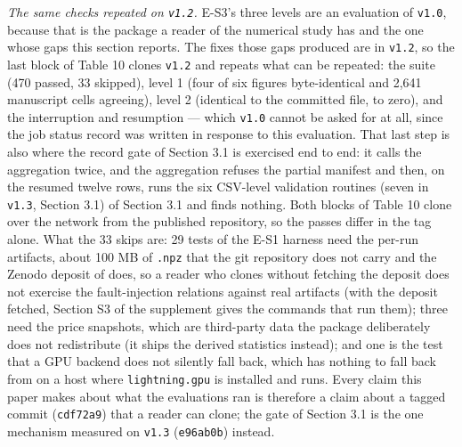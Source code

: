 \documentclass[acmsmall,screen,review]{acmart}
\begin{document}
\textit{The same checks repeated on \texttt{v1.2}.} E-S3's three levels are an evaluation of \texttt{v1.0}, because that is the package a reader of the numerical study has and the one whose gaps this section reports. The fixes those gaps produced are in \texttt{v1.2}, so the last block of Table 10 clones \texttt{v1.2} and repeats what can be repeated: the suite (470 passed, 33 skipped), level 1 (four of six figures byte-identical and 2,641 manuscript cells agreeing), level 2 (identical to the committed file, to zero), and the interruption and resumption --- which \texttt{v1.0} cannot be asked for at all, since the job status record was written in response to this evaluation. That last step is also where the record gate of Section 3.1 is exercised end to end: it calls the aggregation twice, and the aggregation refuses the partial manifest and then, on the resumed twelve rows, runs the six CSV-level validation routines (seven in \texttt{v1.3}, Section 3.1) of Section 3.1 and finds nothing. Both blocks of Table 10 clone over the network from the published repository, so the passes differ in the tag alone. What the 33 skips are: 29 tests of the E-S1 harness need the per-run artifacts, about 100 MB of \texttt{.npz} that the git repository does not carry and the Zenodo deposit of \cite{ref1} does, so a reader who clones without fetching the deposit does not exercise the fault-injection relations against real artifacts (with the deposit fetched, Section S3 of the supplement gives the commands that run them); three need the price snapshots, which are third-party data the package deliberately does not redistribute (it ships the derived statistics instead); and one is the test that a GPU backend does not silently fall back, which has nothing to fall back from on a host where \texttt{lightning.gpu} is installed and runs. Every claim this paper makes about what the evaluations ran is therefore a claim about a tagged commit (\texttt{cdf72a9}) that a reader can clone; the gate of Section 3.1 is the one mechanism measured on \texttt{v1.3} (\texttt{e96ab0b}) instead.
\end{document}

